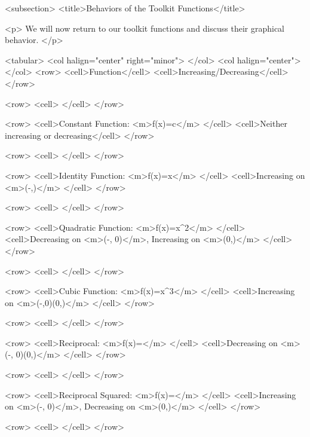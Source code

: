     <subsection>
        <title>Behaviors of the Toolkit Functions</title>

        <p>
            We will now return to our toolkit functions and discuss their graphical behavior.
        </p>

        <tabular>
            <col halign="center" right="minor"> </col> <col halign="center"> </col>
            <row>
                <cell>Function</cell>
                <cell>Increasing/Decreasing</cell>
            </row>

            <row>
                <cell> </cell>
            </row>

            <row>
                <cell>Constant Function: <m>f(x)=c</m> </cell>
                <cell>Neither increasing or decreasing</cell>
            </row>

            <row>
                <cell> </cell>
            </row>

            <row>
                <cell>Identity Function: <m>f(x)=x</m> </cell>
                <cell>Increasing on <m>(-\infty,\infty)</m> </cell>
            </row>

            <row>
                <cell> </cell>
            </row>

            <row>
                <cell>Quadratic Function: <m>f(x)=x^{2}</m> </cell>
                <cell>Decreasing on <m>(-\infty, 0)</m>, Increasing on <m>(0,\infty)</m> </cell>
            </row>

            <row>
                <cell> </cell>
            </row>

            <row>
                <cell>Cubic Function: <m>f(x)=x^{3}</m> </cell>
                <cell>Increasing on <m>(-\infty,0)\cup(0,\infty)</m> </cell>
            </row>

            <row>
                <cell> </cell>
            </row>

            <row>
                <cell>Reciprocal: <m>f(x)=</m> </cell>
                <cell>Decreasing on <m>(-\infty, 0)\cup(0,\infty)</m> </cell>
            </row>

            <row>
                <cell> </cell>
            </row>

            <row>
                <cell>Reciprocal Squared: <m>f(x)=</m> </cell>
                <cell>Increasing on <m>(-\infty, 0)</m>, Decreasing on <m>(0,\infty)</m> </cell>
            </row>

            <row>
                <cell> </cell>
            </row>

